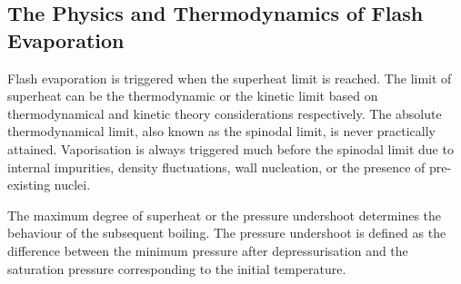 \subsection{The Physics and Thermodynamics of Flash Evaporation}
Flash evaporation is triggered when the superheat limit is reached.
 The limit of superheat can be the thermodynamic or the kinetic limit based
 on thermodynamical and kinetic theory considerations respectively. 
 The absolute thermodynamical limit, also known as the spinodal limit, is never
 practically attained. Vaporisation is always triggered much before the spinodal limit due to 
 internal impurities, density fluctuations, wall nucleation, or  the presence of 
 pre-existing nuclei.~\cite{pinhasiModelingFlashingTwoPhase2005,liaoComputationalModellingFlash2017}


The maximum 
 degree of superheat or the pressure undershoot determines the behaviour of the
 subsequent boiling. The pressure undershoot is defined as the difference between
 the minimum pressure after depressurisation and the saturation pressure corresponding
 to the initial temperature.

 

